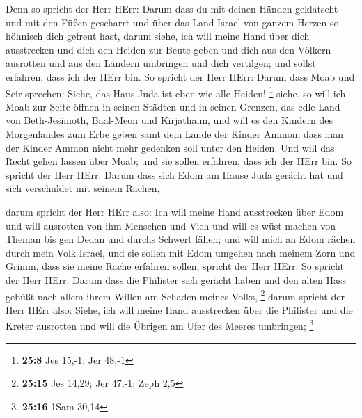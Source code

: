  Denn so spricht der Herr HErr: Darum dass du mit deinen
Händen geklatscht und mit den Füßen gescharrt und über das Land Israel
von ganzem Herzen so höhnisch dich gefreut hast,  darum
siehe, ich will meine Hand über dich ausstrecken und dich den Heiden zur
Beute geben und dich aus den Völkern ausrotten und aus den Ländern
umbringen und dich vertilgen; und sollst erfahren, dass ich der HErr
bin.  So spricht der Herr HErr: Darum dass Moab und Seir
sprechen: Siehe, das Haus Juda ist eben wie alle Heiden! \footnote{\textbf{25:8}
  Jes 15,-1; Jer 48,-1}  siehe, so will ich Moab zur Seite
öffnen in seinen Städten und in seinen Grenzen, das edle Land von
Beth-Jesimoth, Baal-Meon und Kirjathaim,  und will es den
Kindern des Morgenlandes zum Erbe geben samt dem Lande der Kinder Ammon,
dass man der Kinder Ammon nicht mehr gedenken soll unter den Heiden.
 Und will das Recht gehen lassen über Moab; und sie sollen
erfahren, dass ich der HErr bin.  So spricht der Herr HErr:
Darum dass sich Edom am Hause Juda gerächt hat und sich verschuldet mit
seinem Rächen,

 darum spricht der Herr HErr also: Ich will meine Hand
ausstrecken über Edom und will ausrotten von ihm Menschen und Vieh und
will es wüst machen von Theman bis gen Dedan und durchs Schwert fällen;
 und will mich an Edom rächen durch mein Volk Israel, und
sie sollen mit Edom umgehen nach meinem Zorn und Grimm, dass sie meine
Rache erfahren sollen, spricht der Herr HErr.  So spricht
der Herr HErr: Darum dass die Philister sich gerächt haben und den alten
Hass gebüßt nach allem ihrem Willen am Schaden meines Volks, \footnote{\textbf{25:15}
  Jes 14,29; Jer 47,-1; Zeph 2,5}  darum spricht der Herr
HErr also: Siehe, ich will meine Hand ausstrecken über die Philister und
die Kreter ausrotten und will die Übrigen am Ufer des Meeres umbringen;
\footnote{\textbf{25:16} 1Sam 30,14}

